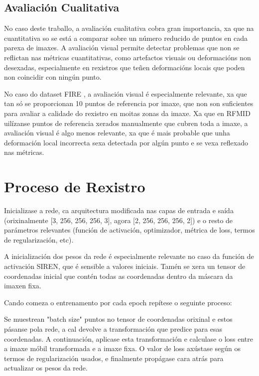 \subsection{Avaliación Cualitativa}
\label{subsec:Avaliación Cualitativa}

No caso deste traballo, a avaliación cualitativa cobra gran importancia, xa que na cuantitativa so se está a comparar sobre un número reducido de puntos en cada parexa de imaxes.
A avaliación visual permite detectar problemas que non se reflictan nas métricas cuantitativas, como artefactos visuais ou deformacións non desexadas, 
especialmente en rexistros que teñen deformacións locais que poden non coincidir con ningún punto.

No caso do dataset FIRE \cite{FIRE}, a avaliación visual é especialmente relevante, xa que tan só se proporcionan 10 puntos de referencia por imaxe, que non son suficientes para avaliar a calidade do rexistro en moitas zonas da imaxe.
Xa que en RFMID \cite{RFMiD} uilízanse puntos de referencia xerados manualmente que cubren toda a imaxe, a avaliación visual é algo menos relevante, xa que é mais probable que unha deformación local incorrecta sexa detectada por algún punto e se vexa reflexado nas métricas.

\section{Proceso de Rexistro}
\label{sec:Proceso de Rexistro}

Inicializase a rede, ca arquitectura modificada nas capas de entrada e saída 
(orixinalmente [3, 256, 256, 256, 3], agora [2, 256, 256, 256, 2]) 
e o resto de parámetros relevantes (función de activación, optimizador, métrica de loss, termos de regularización, etc).

A inicialización dos pesos da rede é especialmente relevante no caso da función de activación SIREN, que é sensible a valores iniciais.
Tamén se xera un tensor de coordenadas inicial que contén todas as coordenadas dentro da máscara da imaxen fixa.

Cando comeza o entrenamento por cada epoch repítese o seguinte proceso:

Se muestrean "batch size" puntos no tensor de coordenadas orixinal e estos pásanse pola rede, 
a cal devolve a transformación que predice para esas coordenadas.
A continuación, aplicase esta transformación e calculase o loss entre a imaxe móbil transformada e a imaxe fixa.
O valor de loss axústase según os termos de regularización usados, e finalmente propágase cara atrás para actualizar os pesos da rede.

